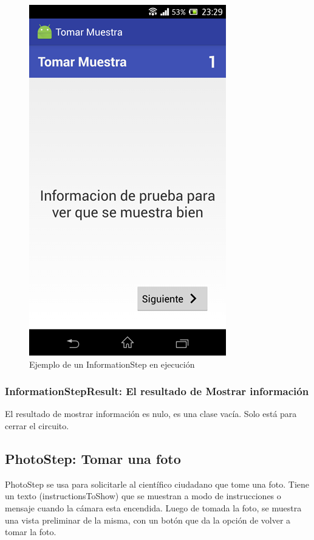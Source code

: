 \begin{figure}[H]
  \centering
    \includegraphics[scale=0.4]{05-implementacion/InformationStep.png} 
   \caption{Ejemplo de un InformationStep en ejecución}
   \label{fig:imgInformationStep}
\end{figure}

\subsubsection{InformationStepResult: El resultado de Mostrar información}
El resultado de mostrar información es nulo, es una clase vacía. Solo está para cerrar el circuito.

\subsection{PhotoStep: Tomar una foto}
PhotoStep se usa para solicitarle al científico ciudadano que tome una foto. Tiene un texto (instructionsToShow) que se muestran a modo de instrucciones o mensaje cuando la cámara esta encendida. Luego de tomada la foto, se muestra una vista preliminar de la misma, con un botón que da la opción de volver a tomar la foto.

